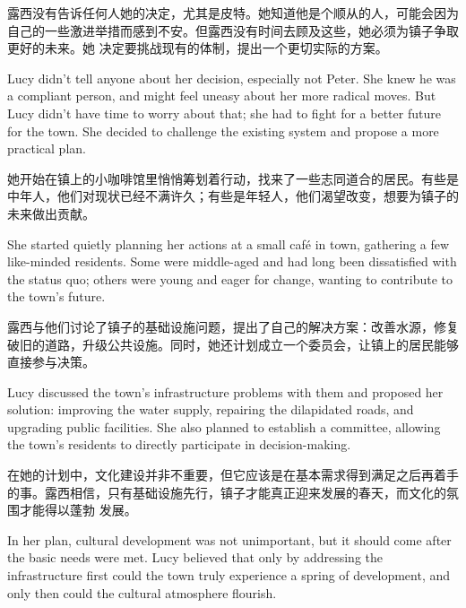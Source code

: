 露西没有告诉任何人她的决定，尤其是皮特。她知道他是个顺从的人，可能会因为自己的一些激进举措而感到不安。但露西没有时间去顾及这些，她必须为镇子争取更好的未来。她
决定要挑战现有的体制，提出一个更切实际的方案。

\begin{flushright} Lucy didn’t tell anyone about her decision, especially not
    Peter. She knew he was a compliant person, and might feel uneasy about her
    more
    radical moves. But Lucy didn’t have time to worry about that; she had to
    fight
    for a better future for the town. She decided to challenge the existing
    system
    and propose a more practical plan. \end{flushright}

她开始在镇上的小咖啡馆里悄悄筹划着行动，找来了一些志同道合的居民。有些是中年人，他们对现状已经不满许久；有些是年轻人，他们渴望改变，想要为镇子的未来做出贡献。

\begin{flushright} She started quietly planning her actions at a small café in
    town, gathering a few like-minded residents. Some were middle-aged and had
    long
    been dissatisfied with the status quo; others were young and eager for
    change,
    wanting to contribute to the town’s future. \end{flushright}

露西与他们讨论了镇子的基础设施问题，提出了自己的解决方案：改善水源，修复破旧的道路，升级公共设施。同时，她还计划成立一个委员会，让镇上的居民能够直接参与决策。

\begin{flushright} Lucy discussed the town’s infrastructure problems with them
    and proposed her solution: improving the water supply, repairing the
    dilapidated roads, and upgrading public facilities. She also planned to
    establish a committee, allowing the town's residents to directly
    participate in
    decision-making. \end{flushright}

在她的计划中，文化建设并非不重要，但它应该是在基本需求得到满足之后再着手的事。露西相信，只有基础设施先行，镇子才能真正迎来发展的春天，而文化的氛围才能得以蓬勃
发展。

\begin{flushright} In her plan, cultural development was not unimportant, but
    it should come after the basic needs were met. Lucy believed that only by
    addressing the infrastructure first could the town truly experience a
    spring of
    development, and only then could the cultural atmosphere flourish.
\end{flushright}

